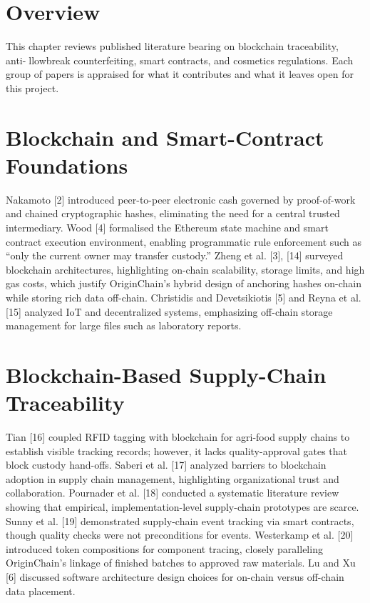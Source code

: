 \documentclass[12pt,a4paper]{report}
\begin{document}
\section{Overview}
This chapter reviews published literature bearing on blockchain traceability, anti-llowbreak counterfeiting, smart contracts, and cosmetics regulations. Each group of papers is appraised for what it contributes and what it leaves open for this project.

\section{Blockchain and Smart-Contract Foundations}
Nakamoto [2] introduced peer-to-peer electronic cash governed by proof-of-work and chained cryptographic hashes, eliminating the need for a central trusted intermediary. Wood [4] formalised the Ethereum state machine and smart contract execution environment, enabling programmatic rule enforcement such as ``only the current owner may transfer custody.'' Zheng et al. [3], [14] surveyed blockchain architectures, highlighting on-chain scalability, storage limits, and high gas costs, which justify OriginChain's hybrid design of anchoring hashes on-chain while storing rich data off-chain. Christidis and Devetsikiotis [5] and Reyna et al. [15] analyzed IoT and decentralized systems, emphasizing off-chain storage management for large files such as laboratory reports.

\section{Blockchain-Based Supply-Chain Traceability}
Tian [16] coupled RFID tagging with blockchain for agri-food supply chains to establish visible tracking records; however, it lacks quality-approval gates that block custody hand-offs. Saberi et al. [17] analyzed barriers to blockchain adoption in supply chain management, highlighting organizational trust and collaboration. Pournader et al. [18] conducted a systematic literature review showing that empirical, implementation-level supply-chain prototypes are scarce. Sunny et al. [19] demonstrated supply-chain event tracking via smart contracts, though quality checks were not preconditions for events. Westerkamp et al. [20] introduced token compositions for component tracing, closely paralleling OriginChain's linkage of finished batches to approved raw materials. Lu and Xu [6] discussed software architecture design choices for on-chain versus off-chain data placement.
\end{document}
